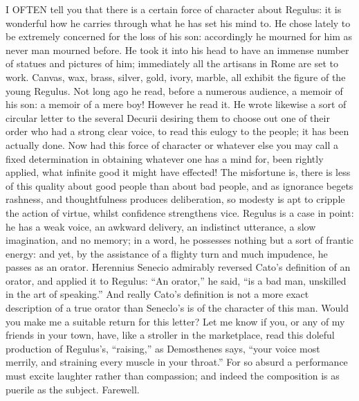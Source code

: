 I OFTEN tell you that there is a certain force of character about Regulus:
it is wonderful how he carries through what he has set his mind to. He
chose lately to be extremely concerned for the loss of his son:
accordingly he mourned for him as never man mourned before. He took it
into his head to have an immense number of statues and pictures of him;
immediately all the artisans in Rome are set to work. Canvas, wax, brass,
silver, gold, ivory, marble, all exhibit the figure of the young Regulus.
Not long ago he read, before a numerous audience, a memoir of his son: a
memoir of a mere boy! However he read it. He wrote likewise a sort of
circular letter to the several Decurii desiring them to choose out one of
their order who had a strong clear voice, to read this eulogy to the
people; it has been actually done. Now had this force of character or
whatever else you may call a fixed determination in obtaining whatever one
has a mind for, been rightly applied, what infinite good it might have
effected! The misfortune is, there is less of this quality about good
people than about bad people, and as ignorance begets rashness, and
thoughtfulness produces deliberation, so modesty is apt to cripple the
action of virtue, whilst confidence strengthens vice. Regulus is a case in
point: he has a weak voice, an awkward delivery, an indistinct utterance,
a slow imagination, and no memory; in a word, he possesses nothing but a
sort of frantic energy: and yet, by the assistance of a flighty turn and
much impudence, he passes as an orator. Herennius Senecio admirably
reversed Cato's definition of an orator, and applied it to Regulus: ``An
orator,'' he said, ``is a bad man, unskilled in the art of speaking.'' And
really Cato's definition is not a more exact description of a true orator
than Seneclo's is of the character of this man. Would you make me a
suitable return for this letter? Let me know if you, or any of my friends
in your town, have, like a stroller in the marketplace, read this doleful
production of Regulus's, ``raising,'' as Demosthenes says, ``your voice most
merrily, and straining every muscle in your throat.'' For so absurd a
performance must excite laughter rather than compassion; and indeed the
composition is as puerile as the subject. Farewell.


